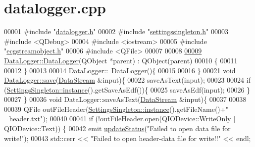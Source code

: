 \hypertarget{datalogger_8cpp_source}{}\section{datalogger.\+cpp}
\label{datalogger_8cpp_source}

\begin{DoxyCode}
00001 \textcolor{preprocessor}{#include "\hyperlink{datalogger_8h}{datalogger.h}"}
00002 \textcolor{preprocessor}{#include "\hyperlink{settingssingleton_8h}{settingssingleton.h}"}
00003 \textcolor{preprocessor}{#include <QDebug>}
00004 \textcolor{preprocessor}{#include <iostream>}
00005 \textcolor{preprocessor}{#include "\hyperlink{ecgstreamobject_8h}{ecgstreamobject.h}"}
00006 \textcolor{preprocessor}{#include <QFile>}
00007 
00008 
\hypertarget{datalogger_8cpp_source.tex_l00009}{}\hyperlink{classDataLogger_a4b383913e0fd834ff9b0d8bbd295c2db}{00009} \hyperlink{classDataLogger_a4b383913e0fd834ff9b0d8bbd295c2db}{DataLogger::DataLogger}(QObject *parent) : QObject(parent)
00010 \{
00011 
00012 \}
00013 
\hypertarget{datalogger_8cpp_source.tex_l00014}{}\hyperlink{classDataLogger_a9aaff109f3e7749a0a0a0313655da50a}{00014} \hyperlink{classDataLogger_a9aaff109f3e7749a0a0a0313655da50a}{DataLogger::~DataLogger}()\{
00015 
00016 \}
\hypertarget{datalogger_8cpp_source.tex_l00021}{}\hyperlink{classDataLogger_a17296a2d3088e979c9b1f48e68caf9ad}{00021} \textcolor{keywordtype}{void} \hyperlink{classDataLogger_a17296a2d3088e979c9b1f48e68caf9ad}{DataLogger::save}(\hyperlink{classDataStream}{DataStream} &input)\{
00022     saveAsText(input);
00023 
00024     \textcolor{keywordflow}{if}  (\hyperlink{classSettingsSingleton_aad528becd7ce5903c418a5b8b718074c}{SettingsSingleton::instance}().getSaveAsEdf())\{
00025         saveAsEdf(input);
00026     \}
00027 \}
00036 \textcolor{keywordtype}{void} DataLogger::saveAsText(\hyperlink{classDataStream}{DataStream} &input)\{
00037 
00038 
00039             QFile outFileHeader(\hyperlink{classSettingsSingleton_aad528becd7ce5903c418a5b8b718074c}{SettingsSingleton::instance}().getFileName()+\textcolor{stringliteral}{"
      \_header.txt"});
00040 
00041                 \textcolor{keywordflow}{if} (!outFileHeader.open(QIODevice::WriteOnly | QIODevice::Text)) \{
00042                 emit \hyperlink{classDataLogger_a59e42d6e77f7fd97ea23529abb6c275c}{updateStatus}(\textcolor{stringliteral}{"Failed to open data file for write!"});
00043                     std::cerr << \textcolor{stringliteral}{"Failed to open header-data file for write!!"} << endl;

\end{DoxyCode}
